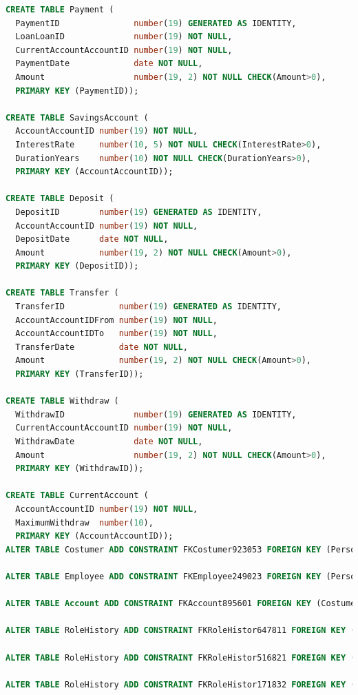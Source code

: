 \documentclass[a4paper, 10pt]{article}
\begin{document}
\begin{lstlisting}[language=SQL]
CREATE TABLE Payment (
  PaymentID               number(19) GENERATED AS IDENTITY, 
  LoanLoanID              number(19) NOT NULL, 
  CurrentAccountAccountID number(19) NOT NULL, 
  PaymentDate             date NOT NULL, 
  Amount                  number(19, 2) NOT NULL CHECK(Amount>0), 
  PRIMARY KEY (PaymentID));

CREATE TABLE SavingsAccount (
  AccountAccountID number(19) NOT NULL, 
  InterestRate     number(10, 5) NOT NULL CHECK(InterestRate>0), 
  DurationYears    number(10) NOT NULL CHECK(DurationYears>0), 
  PRIMARY KEY (AccountAccountID));

CREATE TABLE Deposit (
  DepositID        number(19) GENERATED AS IDENTITY, 
  AccountAccountID number(19) NOT NULL, 
  DepositDate      date NOT NULL, 
  Amount           number(19, 2) NOT NULL CHECK(Amount>0), 
  PRIMARY KEY (DepositID));

CREATE TABLE Transfer (
  TransferID           number(19) GENERATED AS IDENTITY, 
  AccountAccountIDFrom number(19) NOT NULL, 
  AccountAccountIDTo   number(19) NOT NULL, 
  TransferDate         date NOT NULL, 
  Amount               number(19, 2) NOT NULL CHECK(Amount>0), 
  PRIMARY KEY (TransferID));

CREATE TABLE Withdraw (
  WithdrawID              number(19) GENERATED AS IDENTITY, 
  CurrentAccountAccountID number(19) NOT NULL, 
  WithdrawDate            date NOT NULL, 
  Amount                  number(19, 2) NOT NULL CHECK(Amount>0), 
  PRIMARY KEY (WithdrawID));

CREATE TABLE CurrentAccount (
  AccountAccountID number(19) NOT NULL, 
  MaximumWithdraw  number(10), 
  PRIMARY KEY (AccountAccountID));
ALTER TABLE Costumer ADD CONSTRAINT FKCostumer923053 FOREIGN KEY (PersonGovID) REFERENCES Person (GovID);

ALTER TABLE Employee ADD CONSTRAINT FKEmployee249023 FOREIGN KEY (PersonGovID) REFERENCES Person (GovID);

ALTER TABLE Account ADD CONSTRAINT FKAccount895601 FOREIGN KEY (CostumerCostumerID) REFERENCES Costumer (CostumerID);

ALTER TABLE RoleHistory ADD CONSTRAINT FKRoleHistor647811 FOREIGN KEY (RoleRoleID) REFERENCES Role (RoleID);

ALTER TABLE RoleHistory ADD CONSTRAINT FKRoleHistor516821 FOREIGN KEY (EmployeeEmployeeID) REFERENCES Employee (EmployeeID);

ALTER TABLE RoleHistory ADD CONSTRAINT FKRoleHistor171832 FOREIGN KEY (BranchBranchId) REFERENCES Branch (BranchId);


\end{lstlisting}
\end{document}
